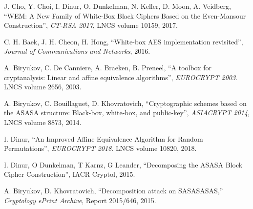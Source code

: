 \documentclass{ieeeaccess}
\begin{document}
\begin{thebibliography}{00}
J. Cho, Y. Choi, I. Dinur, O. Dunkelman, N. Keller, D. Moon, A. Veidberg, 
``WEM: A New Family of White-Box Black Ciphers Based on the Even-Mansour Construction'', 
\emph{CT-RSA 2017}, LNCS volume 10159, 2017.

 C. H. Baek, J. H. Cheon, H. Hong, 
 ``White-box AES implementation revisited'', 
 \emph{Journal of Communications and Networks}, 2016.
 
A. Biryukov, C. De Canniere, A. Braeken, B. Preneel, 
``A toolbox for cryptanalysis: Linear and affine equivalence algorithms'', 
\emph{EUROCRYPT 2003}. LNCS volume 2656, 2003.

A. Biryukov, C. Bouillaguet, D. Khovratovich, 
``Cryptographic schemes based on the ASASA structure: Black-box, white-box, and public-key'', 
\emph{ASIACRYPT 2014}, LNCS volume 8873, 2014.

I. Dinur, 
``An Improved Affine Equivalence Algorithm for Random Permutations'', 
\emph{EUROCRYPT 2018}. LNCS volume 10820, 2018.

I. Dinur, O Dunkelman, T Karnz, G Leander, 
``Decomposing the ASASA Block Cipher Construction'', IACR Cryptol, 2015.

A. Biryukov, D. Khovratovich, 
``Decomposition attack on SASASASAS,'' 
\emph{Cryptology ePrint Archive}, Report 2015/646, 2015.




\end{thebibliography}

\EOD
\end{document}
